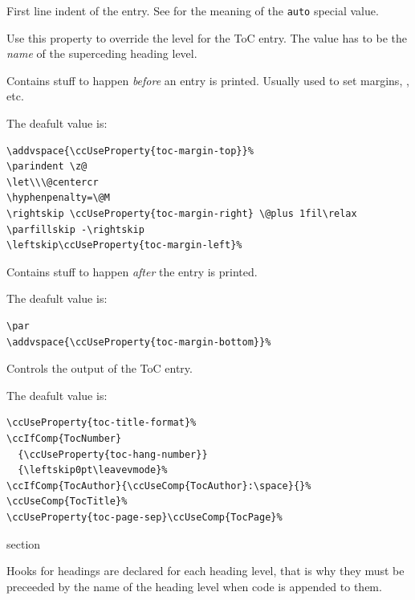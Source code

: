 First line indent of the entry. See  for the
meaning of the \texttt{auto} special value.



Use this property to override the level for the ToC entry. The value has to
be the \textit{name} of the superceding heading level.



Contains stuff to happen \textit{before} an entry is printed. Usually
used to set margins, \texttt{\string\parindent}, etc.

The deafult value is:
\begin{lstlisting}[style=tex]
\addvspace{\ccUseProperty{toc-margin-top}}%
\parindent \z@
\let\\\@centercr
\hyphenpenalty=\@M
\rightskip \ccUseProperty{toc-margin-right} \@plus 1fil\relax
\parfillskip -\rightskip
\leftskip\ccUseProperty{toc-margin-left}%
\end{lstlisting}



Contains stuff to happen \textit{after} the entry is printed.

The deafult value is:
\begin{lstlisting}[style=tex]
\par
\addvspace{\ccUseProperty{toc-margin-bottom}}%
\end{lstlisting}



Controls the output of the ToC entry.

The deafult value is:
\begin{lstlisting}[style=tex]
\ccUseProperty{toc-title-format}%
\ccIfComp{TocNumber}
  {\ccUseProperty{toc-hang-number}}
  {\leftskip0pt\leavevmode}%
\ccIfComp{TocAuthor}{\ccUseComp{TocAuthor}:\space}{}%
\ccUseComp{TocTitle}%
\ccUseProperty{toc-page-sep}\ccUseComp{TocPage}%
\end{lstlisting}

\begin{Heading}[label=sec:hdg:hooks]{section}
\end{Heading}

Hooks for headings are declared for each heading level, that is why
they must be preceeded by the name of the heading level when code is
appended to them.

